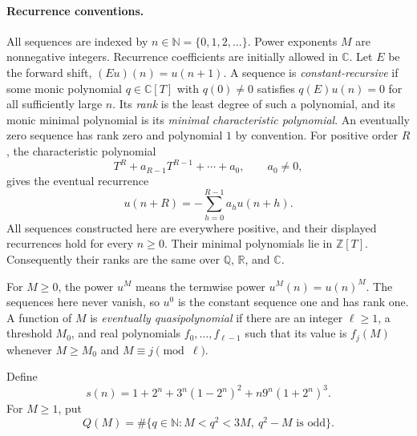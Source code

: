 \documentclass[11pt,a4paper]{article}
\newcommand{\NN}{\mathbb N}
\newcommand{\CC}{\mathbb C}
\newcommand{\QQ}{\mathbb Q}
\newcommand{\ZZ}{\mathbb Z}
\begin{document}
\paragraph{Recurrence conventions.}
All sequences are indexed by $n\in\NN=\{0,1,2,\ldots\}$.
Power exponents $M$ are nonnegative integers.
Recurrence coefficients are initially allowed in $\CC$.
Let $E$ be the forward shift, $(Eu)(n)=u(n+1)$.
A sequence is \emph{constant-recursive} if some monic polynomial $q\in\CC[T]$
with $q(0)\ne0$ satisfies $q(E)u(n)=0$ for all sufficiently large $n$.
Its \emph{rank} is the least degree of such a polynomial, and its monic
minimal polynomial is its \emph{minimal characteristic polynomial}.
An eventually zero sequence has rank zero and polynomial $1$ by convention.
For positive order $R$, the characteristic polynomial
\[
 T^R+a_{R-1}T^{R-1}+\cdots+a_0,\qquad a_0\ne0,
\]
gives the eventual recurrence
\[
 u(n+R)=-\sum_{h=0}^{R-1}a_hu(n+h).
\]
All sequences constructed here are everywhere positive, and their displayed
recurrences hold for every $n\ge0$. Their minimal polynomials lie in $\ZZ[T]$.
Consequently their ranks are the same over $\QQ$, $\mathbb R$, and $\CC$.

For $M\ge0$, the power $u^M$ means the termwise power $u^M(n)=u(n)^M$.
The sequences here never vanish, so $u^0$ is the constant sequence one and has rank one.
A function of $M$ is \emph{eventually quasipolynomial} if there are an integer
$\ell\ge1$, a threshold $M_0$, and real polynomials $f_0,\ldots,f_{\ell-1}$
such that its value is $f_j(M)$ whenever $M\ge M_0$ and $M\equiv j\pmod\ell$.

Define
\begin{equation}\label{eq:s}
 s(n)=1+2^n+3^n(1-2^n)^2+n9^n(1+2^n)^3.
\end{equation}
For $M\ge1$, put
\begin{equation}\label{eq:Q}
 Q(M)=\#\{q\in\NN:M<q^2<3M,\ q^2-M\text{ is odd}\}.
\end{equation}
\end{document}
